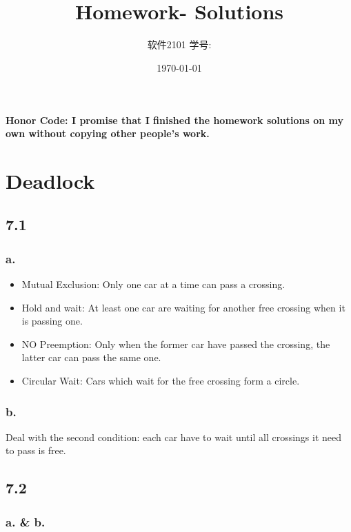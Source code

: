 \documentclass[11pt]{article}
\title{\vspace{-4cm}\CourseCodeName \space
        \Session \protect\\  Homework-\textbf{\Homework} Solutions}
\author{软件2101 \Name \space 学号: \SID}
\date{\today}
\begin{document}
\maketitle
\vspace{-0.8cm}
\textbf{Honor Code: I promise that I finished the homework solutions on my own without copying other people's 
    work.}

\section*{Deadlock}

\subsection*{7.1 }

\subsubsection*{a. }

\begin{itemize}
    \item Mutual Exclusion: Only one car at a time can pass a crossing.
    \item Hold and wait: At least one car are waiting for another free crossing when it is passing one.
    \item NO Preemption: Only when the former car have passed the crossing, the latter car can pass the same one.
    \item Circular Wait: Cars which wait for the free crossing form a circle.
\end{itemize}

\subsubsection*{b. }

Deal with the second condition: each car have to wait until all crossings it need to pass is free.

\subsection*{7.2 }

\subsubsection*{a. \& b. }
\end{document}

